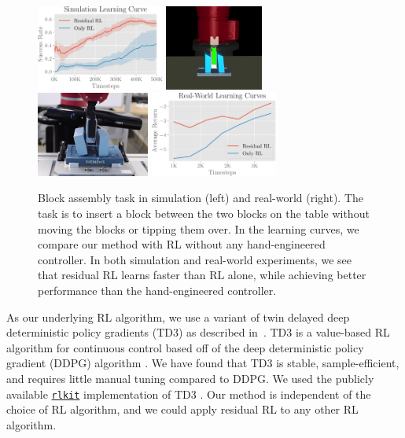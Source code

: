 \begin{figure}[t]
    \vspace{6pt}
    \centering
    \includegraphics[height=1.1in]{residualrl/figs/sim_learning_curve3.pdf}
    \includegraphics[height=1.1in]{residualrl/figs/sawyer_env.png} 
    \hspace{.1cm}
    \includegraphics[height=1.1in]{residualrl/figs/real_world_env.png} 
    \vspace{0.1cm}
    \includegraphics[height=1.1in]{residualrl/figs/real_residualrl_comparison.pdf}
    \caption{Block assembly task in simulation (left) and  real-world (right). The task is to insert a block between the two blocks on the table without moving the blocks or tipping them over. In the learning curves, we compare our method with RL without any hand-engineered controller\protect\footnotemark. In both simulation and real-world experiments, we see that residual RL learns faster than RL alone, while achieving better performance than the hand-engineered controller. }%
    \label{fig:fig2}
\end{figure}

As our underlying RL algorithm, we use a variant of twin delayed deep deterministic policy gradients (TD3)
as described in~\cite{fujimoto2018td3}. TD3 is a value-based RL algorithm for continuous control based off of the deep deterministic policy gradient (DDPG) algorithm \cite{lillicrap2015continuous}. We have found that TD3 is stable, sample-efficient, and requires little manual tuning compared to DDPG.
We used the publicly available \href{https://github.com/vitchyr/rlkit}{\texttt{rlkit}} implementation of TD3 \cite{pong2018tdm}. Our method is independent of the choice of RL algorithm, and we could apply residual RL to any other RL algorithm.